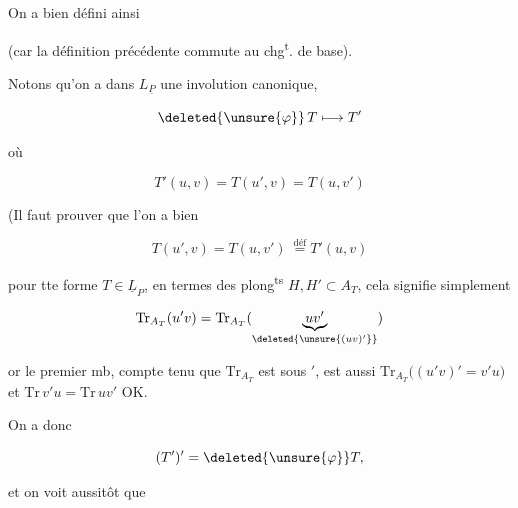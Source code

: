 
 On a bien défini ainsi


(car la définition précédente commute
au chg\textsuperscript{t}. de base).

Notons qu'on a dans $L_{\underline P}$ une involution
canonique,

\[
\deleted{\unsure{\varphi}}\,T\longmapsto T'
\]

où

\[
T'(u,v)=T(u',v)=T(u,v')
\]

(Il faut prouver que l'on a bien

\[
\boxed{T(u',v)=T(u,v')}\ \overset{\mathrm{déf}}{=}T'(u,v)
\]

pour tte forme $T\in\underline L_P$,  en
termes des plong\textsuperscript{ts} $H,H'\subset A_T$,
cela signifie simplement

\[
\mathrm{Tr}_{A_T}(u'v)=\mathrm{Tr}_{A_T}(\underbrace{uv'}_{\deleted{\unsure{(uv)'}}})
\]

or le premier mb, compte tenu que
$\mathrm{Tr}_{A_T}$ est  sous $'$, est aussi
$\mathrm{Tr}_{A_T}\bigl((u'v)'=v'u\bigr)$ et $\mathrm{Tr}\,v'u=\mathrm{Tr}\,uv'$ OK.

On a donc

\[
(T')'=\deleted{\unsure{\varphi}}T,
\]

et on voit aussitôt que

